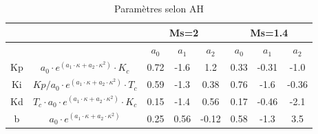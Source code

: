 \begin{table}[h]
	\begin{center}
		\begin{tabular}{|c|c|c|c|c||c|c|c|}
			\hline
			\multicolumn{2}{|c|}{} & \multicolumn{3}{|c|}{Ms=2}& \multicolumn{3}{|c|}{Ms=1.4} \\
			\hline
			&  & $a_0$ & $a_1$ & $a_2$& $a_0$ & $a_1$ & $a_2$ \\
			\hline
			Kp & $a_0\cdot e^{(a_1\cdot \kappa+ a_2 \cdot \kappa^2)}\cdot K_c$ & 0.72 & -1.6 & 1.2 &0.33&-0.31&-1.0 \\
			\hline
			Ki& $Kp/a_0\cdot e^{(a_1\cdot \kappa+ a_2 \cdot \kappa^2)}\cdot T_c$ & 0.59 & -1.3 & 0.38 &0.76&-1.6 &-0.36 \\
			\hline
			Kd& $ T_c\cdot a_0\cdot e^{(a_1\cdot \kappa+ a_2 \cdot \kappa^2)}\cdot K_c$ & 0.15 & -1.4 &  0.56 &0.17&-0.46&-2.1 \\
			\hline
			b& $a_0\cdot e^{(a_1\cdot \kappa+ a_2 \cdot \kappa^2)}$ & 0.25 & 0.56 &  -0.12  &0.58&-1.3&3.5\\
			\hline
		\end{tabular}
	\end{center}
\caption{Paramètres selon AH}
\label{tab:Paramètres selon AH}
\end{table}




